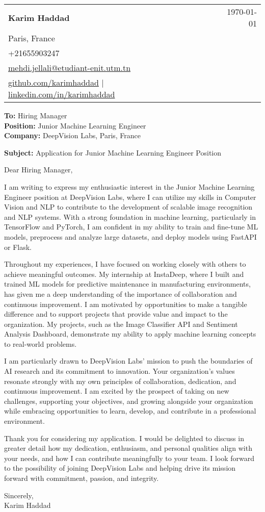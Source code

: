 \documentclass[letterpaper,11pt]{article}
\makeatletter
\newcommand{\letterHeading}[5]{
    \begin{tabular*}{\textwidth}{l@{\extracolsep{\fill}}r}
    \textbf{\Large #1} & #5 \\  %
    #2 & \\
    #3 & \\
    #4 & \\
    \end{tabular*}
    \vspace{15pt}
}
\newcommand{\letterRecipient}[3]{
    \textbf{\large To:} #1 \\
    \textbf{\large Position:} #2 \\
    \textbf{\large Company:} #3 \\
    \vspace{12pt}
}
\newcommand{\letterSubject}[1]{
    \textbf{\large Subject:} #1 \\
    \vspace{15pt}
}
\makeatother
\begin{document}
    \letterHeading
    {Karim Haddad}
    {Paris, France}
    {+21655903247 \\ \href{mailto:mehdi.jellali@etudiant-enit.utm.tn}{mehdi.jellali@etudiant-enit.utm.tn}}
    {\href{https://github.com/karimhaddad}{github.com/karimhaddad} $|$ \href{https://www.linkedin.com/in/karimhaddad}{linkedin.com/in/karimhaddad}}
    {\today}

    \letterRecipient
    {Hiring Manager}
    {Junior Machine Learning Engineer}
    {DeepVision Labs, Paris, France}

    \letterSubject{Application for Junior Machine Learning Engineer Position}

    Dear Hiring Manager,

    I am writing to express my enthusiastic interest in the Junior Machine Learning Engineer position at DeepVision Labs, where I can utilize my skills in Computer Vision and NLP to contribute to the development of scalable image recognition and NLP systems. With a strong foundation in machine learning, particularly in TensorFlow and PyTorch, I am confident in my ability to train and fine-tune ML models, preprocess and analyze large datasets, and deploy models using FastAPI or Flask.

    Throughout my experiences, I have focused on working closely with others to achieve meaningful outcomes. My internship at InstaDeep, where I built and trained ML models for predictive maintenance in manufacturing environments, has given me a deep understanding of the importance of collaboration and continuous improvement. I am motivated by opportunities to make a tangible difference and to support projects that provide value and impact to the organization. My projects, such as the Image Classifier API and Sentiment Analysis Dashboard, demonstrate my ability to apply machine learning concepts to real-world problems.

    I am particularly drawn to DeepVision Labs' mission to push the boundaries of AI research and its commitment to innovation. Your organization's values resonate strongly with my own principles of collaboration, dedication, and continuous improvement. I am excited by the prospect of taking on new challenges, supporting your objectives, and growing alongside your organization while embracing opportunities to learn, develop, and contribute in a professional environment.

    Thank you for considering my application. I would be delighted to discuss in greater detail how my dedication, enthusiasm, and personal qualities align with your needs, and how I can contribute meaningfully to your team. I look forward to the possibility of joining DeepVision Labs and helping drive its mission forward with commitment, passion, and integrity.

    Sincerely,\\[12pt]

    Karim Haddad
\end{document}
